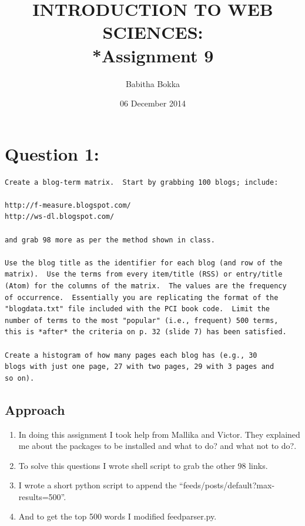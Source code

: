 \documentclass[12pt]{article}
\begin{document}
\begin{titlepage}
\title{INTRODUCTION TO WEB SCIENCES:\\*Assignment 9}
\author{Babitha Bokka}
\date{06 December 2014}
\maketitle
\end{titlepage}

\tableofcontents
\newpage
\section{Question 1:}
\begin{verbatim}
Create a blog-term matrix.  Start by grabbing 100 blogs; include:

http://f-measure.blogspot.com/
http://ws-dl.blogspot.com/

and grab 98 more as per the method shown in class.

Use the blog title as the identifier for each blog (and row of the
matrix).  Use the terms from every item/title (RSS) or entry/title
(Atom) for the columns of the matrix.  The values are the frequency
of occurrence.  Essentially you are replicating the format of the
"blogdata.txt" file included with the PCI book code.  Limit the
number of terms to the most "popular" (i.e., frequent) 500 terms,
this is *after* the criteria on p. 32 (slide 7) has been satisfied.

Create a histogram of how many pages each blog has (e.g., 30
blogs with just one page, 27 with two pages, 29 with 3 pages and 
so on).
\end{verbatim}

\subsection{Approach}
\begin{enumerate}
 \item In doing this assignment I took help from Mallika and Victor. They explained me about the packages to be installed and what to do? and what not to do?.
    \item To solve this questions I wrote shell script to grab the other 98 links.
    \item I wrote a short python script to append the ``feeds/posts/default?max-results=500''.
    \item And to get the top 500 words I modified feedparser.py.  
   
\end{enumerate}
   
\end{document}
